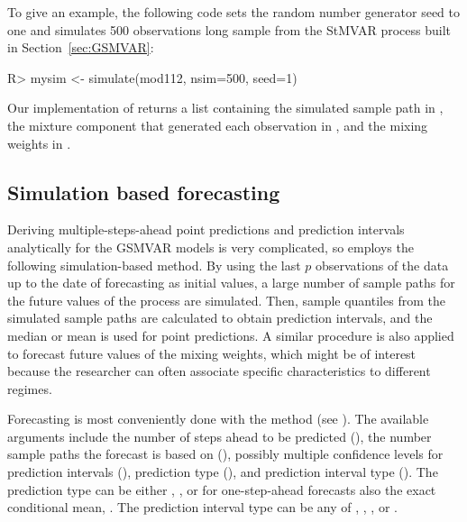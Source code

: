 \documentclass[nojss]{jss} %
\begin{document}
To give an example, the following code sets the random number generator seed to one and simulates 500 observations long sample from the StMVAR process built in Section~\ref{sec:GSMVAR}:
%
\begin{CodeChunk}
\begin{CodeInput}
R> mysim <- simulate(mod112, nsim=500, seed=1)
\end{CodeInput}
\end{CodeChunk}
%
Our implementation of  returns a list containing the simulated sample path in , the mixture component that generated each observation in , and the mixing weights in .

\subsection{Simulation based forecasting}
Deriving multiple-steps-ahead point predictions and prediction intervals analytically for the GSMVAR models is very complicated, so  employs the following simulation-based method. By using the last $p$ observations of the data up to the date of forecasting as initial values, a large number of sample paths for the future values of the process are simulated. Then, sample quantiles from the simulated sample paths are calculated to obtain prediction intervals, and the median or mean is used for point predictions. A similar procedure is also applied to forecast future values of the mixing weights, which might be of interest because the researcher can often associate specific characteristics to different regimes.

Forecasting is most conveniently done with the  method (see ). The available arguments include the number of steps ahead to be predicted (), the number sample paths the forecast is based on (), possibly multiple confidence levels for prediction intervals (), prediction type (), and prediction interval type (). The prediction type can be either , , or for one-step-ahead forecasts also the exact conditional mean, . The prediction interval type can be any of , , , or .
\end{document}
